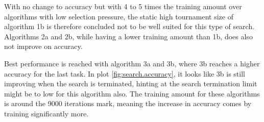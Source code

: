 With no change to accuracy but with 4 to 5 times the training amount over algorithms with low selection pressure, the static high tournament size of algorithm 1b is therefore concluded not to be well suited for this type of search. Algorithms 2a and 2b, while having a lower training amount than 1b, does also not improve on accuracy. 

Best performance is reached with algorithm 3a and 3b, where 3b reaches a higher accuracy for the last task. In plot \ref{fig:search.accuracy}, it looks like 3b is still improving when the search is terminated, hinting at the search termination limit might be to low for this algorithm also. The training amount for these algorithms is around the 9000 iterations mark, meaning the increase in accuracy comes by training significantly more. 

